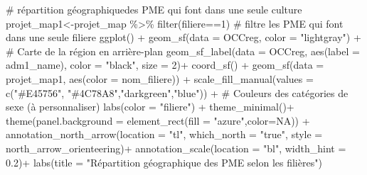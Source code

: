 \documentclass[
  letterpaper,
  DIV=11,
  numbers=noendperiod]{scrartcl}
\newenvironment{Shaded}{\begin{snugshade}}{\end{snugshade}}
\newcommand{\AttributeTok}[1]{\textcolor[rgb]{0.40,0.45,0.13}{#1}}
\newcommand{\CommentTok}[1]{\textcolor[rgb]{0.37,0.37,0.37}{#1}}
\newcommand{\ConstantTok}[1]{\textcolor[rgb]{0.56,0.35,0.01}{#1}}
\newcommand{\DecValTok}[1]{\textcolor[rgb]{0.68,0.00,0.00}{#1}}
\newcommand{\FloatTok}[1]{\textcolor[rgb]{0.68,0.00,0.00}{#1}}
\newcommand{\FunctionTok}[1]{\textcolor[rgb]{0.28,0.35,0.67}{#1}}
\newcommand{\NormalTok}[1]{\textcolor[rgb]{0.00,0.23,0.31}{#1}}
\newcommand{\OtherTok}[1]{\textcolor[rgb]{0.00,0.23,0.31}{#1}}
\newcommand{\SpecialCharTok}[1]{\textcolor[rgb]{0.37,0.37,0.37}{#1}}
\newcommand{\StringTok}[1]{\textcolor[rgb]{0.13,0.47,0.30}{#1}}
\begin{document}
\begin{Shaded}
\begin{Highlighting}[]
\CommentTok{\# répartition géographiquedes PME qui font dans une seule culture}
\NormalTok{projet\_map1}\OtherTok{\textless{}{-}}\NormalTok{projet\_map }\SpecialCharTok{\%\textgreater{}\%} \FunctionTok{filter}\NormalTok{(filiere}\SpecialCharTok{==}\DecValTok{1}\NormalTok{) }\CommentTok{\# filtre les PME qui font dans une seule filiere}
\FunctionTok{ggplot}\NormalTok{() }\SpecialCharTok{+}
  \FunctionTok{geom\_sf}\NormalTok{(}\AttributeTok{data =}\NormalTok{ OCCreg, }\AttributeTok{color =} \StringTok{"lightgray"}\NormalTok{) }\SpecialCharTok{+}  \CommentTok{\# Carte de la région en arrière{-}plan}
  \FunctionTok{geom\_sf\_label}\NormalTok{(}\AttributeTok{data =}\NormalTok{ OCCreg, }\FunctionTok{aes}\NormalTok{(}\AttributeTok{label =}\NormalTok{ adm1\_name), }\AttributeTok{color =} \StringTok{"black"}\NormalTok{, }\AttributeTok{size =} \DecValTok{2}\NormalTok{)}\SpecialCharTok{+}
  \FunctionTok{coord\_sf}\NormalTok{() }\SpecialCharTok{+}
  \FunctionTok{geom\_sf}\NormalTok{(}\AttributeTok{data =}\NormalTok{ projet\_map1, }\FunctionTok{aes}\NormalTok{(}\AttributeTok{color =}\NormalTok{ nom\_filiere)) }\SpecialCharTok{+}
  \FunctionTok{scale\_fill\_manual}\NormalTok{(}\AttributeTok{values =} \FunctionTok{c}\NormalTok{(}\StringTok{"\#E45756"}\NormalTok{, }\StringTok{"\#4C78A8"}\NormalTok{,}\StringTok{"darkgreen"}\NormalTok{,}\StringTok{"blue"}\NormalTok{)) }\SpecialCharTok{+}  \CommentTok{\# Couleurs des catégories de sexe (à personnaliser)}
  \FunctionTok{labs}\NormalTok{(}\AttributeTok{color =} \StringTok{"filiere"}\NormalTok{) }\SpecialCharTok{+}
  \FunctionTok{theme\_minimal}\NormalTok{()}\SpecialCharTok{+}
  \FunctionTok{theme}\NormalTok{(}\AttributeTok{panel.background =} \FunctionTok{element\_rect}\NormalTok{(}\AttributeTok{fill =} \StringTok{"azure"}\NormalTok{,}\AttributeTok{color=}\ConstantTok{NA}\NormalTok{)) }\SpecialCharTok{+}
  \FunctionTok{annotation\_north\_arrow}\NormalTok{(}\AttributeTok{location =} \StringTok{"tl"}\NormalTok{, }\AttributeTok{which\_north =} \StringTok{"true"}\NormalTok{, }\AttributeTok{style =}\NormalTok{ north\_arrow\_orienteering)}\SpecialCharTok{+}
  \FunctionTok{annotation\_scale}\NormalTok{(}\AttributeTok{location =} \StringTok{"bl"}\NormalTok{, }\AttributeTok{width\_hint =} \FloatTok{0.2}\NormalTok{)}\SpecialCharTok{+}
  \FunctionTok{labs}\NormalTok{(}\AttributeTok{title =} \StringTok{"Répartition géographique des PME selon les filières"}\NormalTok{)}
\end{Highlighting}
\end{Shaded}
\end{document}
